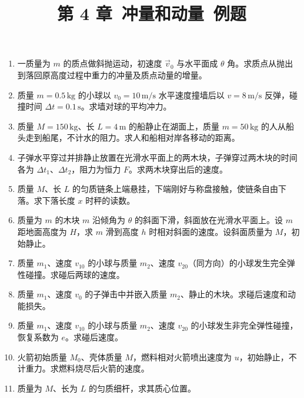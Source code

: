 \documentclass[12pt]{article}
\title{第 4 章\ 冲量和动量\ 例题}
\author{}
\date{}
\begin{document}
\maketitle

\begin{enumerate}[label=\textbf{例\arabic*.}, leftmargin=*]

\item 一质量为 $m$ 的质点做斜抛运动，初速度 $\vec{v}_0$ 与水平面成 $\theta$ 角。求质点从抛出到落回原高度过程中重力的冲量及质点动量的增量。

\item 质量 $m = 0.5\,\mathrm{kg}$ 的小球以 $v_0 = 10\,\mathrm{m/s}$ 水平速度撞墙后以 $v = 8\,\mathrm{m/s}$ 反弹，碰撞时间 $\Delta t = 0.1\,\mathrm{s}$。求墙对球的平均冲力。

\item 质量 $M = 150\,\mathrm{kg}$、长 $L = 4\,\mathrm{m}$ 的船静止在湖面上，质量 $m = 50\,\mathrm{kg}$ 的人从船头走到船尾，不计水的阻力。求人和船相对岸各移动的距离。

\item 子弹水平穿过并排静止放置在光滑水平面上的两木块，子弹穿过两木块的时间各为 $\Delta t_1$、$\Delta t_2$，阻力为恒力 $F$。求两木块穿出后的速度。

\item 质量 $M$、长 $L$ 的匀质链条上端悬挂，下端刚好与称盘接触，使链条自由下落。求下落长度 $x$ 时秤的读数。

\item 质量为 $m$ 的木块 $m$ 沿倾角为 $\theta$ 的斜面下滑，斜面放在光滑水平面上。设 $m$ 距地面高度为 $H$，求 $m$ 滑到高度 $h$ 时相对斜面的速度。设斜面质量为 $M$，初始静止。

\item 质量 $m_1$、速度 $v_{10}$ 的小球与质量 $m_2$、速度 $v_{20}$（同方向）的小球发生完全弹性碰撞。求碰后两球的速度。

\item 质量 $m_1$、速度 $v_0$ 的子弹击中并嵌入质量 $m_2$、静止的木块。求碰后速度和动能损失。

\item 质量 $m_1$、速度 $v_{10}$ 的小球与质量 $m_2$、速度 $v_{20}$ 的小球发生非完全弹性碰撞，恢复系数为 $e$。求碰后速度。

\item 火箭初始质量 $M_0$、壳体质量 $M$，燃料相对火箭喷出速度为 $u$，初始静止，不计重力。求燃料烧尽后火箭的速度。

\item 质量为 $M$、长为 $L$ 的匀质细杆，求其质心位置。


\end{enumerate}
\end{document}
